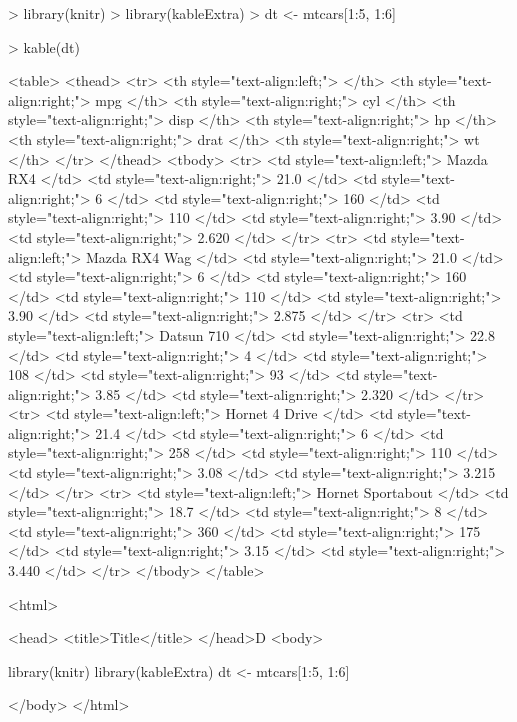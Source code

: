 \documentclass{article}
\begin{document}


\begin{Schunk}
\begin{Sinput}
> library(knitr)
> library(kableExtra)
> dt <- mtcars[1:5, 1:6]
\end{Sinput}
\end{Schunk}





\begin{Schunk}
\begin{Sinput}
> kable(dt)
\end{Sinput}
\begin{Soutput}
<table>
 <thead>
  <tr>
   <th style="text-align:left;">   </th>
   <th style="text-align:right;"> mpg </th>
   <th style="text-align:right;"> cyl </th>
   <th style="text-align:right;"> disp </th>
   <th style="text-align:right;"> hp </th>
   <th style="text-align:right;"> drat </th>
   <th style="text-align:right;"> wt </th>
  </tr>
 </thead>
<tbody>
  <tr>
   <td style="text-align:left;"> Mazda RX4 </td>
   <td style="text-align:right;"> 21.0 </td>
   <td style="text-align:right;"> 6 </td>
   <td style="text-align:right;"> 160 </td>
   <td style="text-align:right;"> 110 </td>
   <td style="text-align:right;"> 3.90 </td>
   <td style="text-align:right;"> 2.620 </td>
  </tr>
  <tr>
   <td style="text-align:left;"> Mazda RX4 Wag </td>
   <td style="text-align:right;"> 21.0 </td>
   <td style="text-align:right;"> 6 </td>
   <td style="text-align:right;"> 160 </td>
   <td style="text-align:right;"> 110 </td>
   <td style="text-align:right;"> 3.90 </td>
   <td style="text-align:right;"> 2.875 </td>
  </tr>
  <tr>
   <td style="text-align:left;"> Datsun 710 </td>
   <td style="text-align:right;"> 22.8 </td>
   <td style="text-align:right;"> 4 </td>
   <td style="text-align:right;"> 108 </td>
   <td style="text-align:right;"> 93 </td>
   <td style="text-align:right;"> 3.85 </td>
   <td style="text-align:right;"> 2.320 </td>
  </tr>
  <tr>
   <td style="text-align:left;"> Hornet 4 Drive </td>
   <td style="text-align:right;"> 21.4 </td>
   <td style="text-align:right;"> 6 </td>
   <td style="text-align:right;"> 258 </td>
   <td style="text-align:right;"> 110 </td>
   <td style="text-align:right;"> 3.08 </td>
   <td style="text-align:right;"> 3.215 </td>
  </tr>
  <tr>
   <td style="text-align:left;"> Hornet Sportabout </td>
   <td style="text-align:right;"> 18.7 </td>
   <td style="text-align:right;"> 8 </td>
   <td style="text-align:right;"> 360 </td>
   <td style="text-align:right;"> 175 </td>
   <td style="text-align:right;"> 3.15 </td>
   <td style="text-align:right;"> 3.440 </td>
  </tr>
</tbody>
</table>
\end{Soutput}
\end{Schunk}

<html>

<head>
<title>Title</title>
</head>D
<body>

library(knitr)
library(kableExtra)
dt <- mtcars[1:5, 1:6]

</body>
</html>
\end{document}
